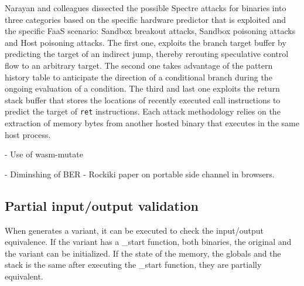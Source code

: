 Narayan and colleagues \cite{Narayan2021Swivel} dissected the possible Spectre attacks for \wasm binaries into three categories based on the specific hardware predictor that is exploited and the specific FaaS scenario: Sandbox breakout attacks, Sandbox poisoning attacks and Host poisoning attacks.
The first one, exploits the branch target buffer by predicting the target of an indirect jump, thereby rerouting speculative control flow to an arbitrary target.
The second one takes advantage of the pattern history table to anticipate the direction of a conditional branch during the ongoing evaluation of a condition.
The third and last one exploits the return stack buffer that stores the locations of recently executed call instructions to predict the target of \texttt{ret} instructions. 
Each attack methodology relies on the extraction of memory bytes from another hosted \wasm binary that executes in the same host process.







- Use of wasm-mutate


- Diminshing of BER
- Rockiki paper on portable side channel in browsers.




\subsection{Partial input/output validation}

When \tool generates a variant, it can be executed to check the input/output equivalence.
If the variant has a \_start function, both binaries, the original and the variant can be initialized. 
If the state of the memory, the globals and the stack is the same after executing the \_start function, they are partially equivalent.


